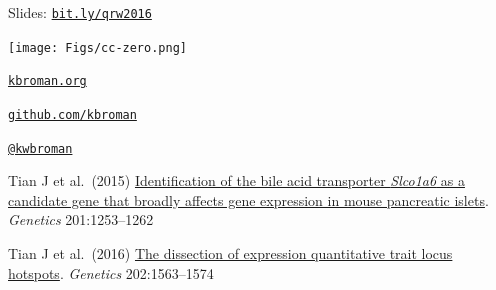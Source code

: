 \documentclass[12pt,t]{beamer}
\begin{document}
\begin{frame}[c]{}

\large

\vspace*{10mm}
Slides: \href{http://bit.ly/qrw2016}{\tt bit.ly/qrw2016}

\vspace*{-5mm}
\hspace{90mm} \texttt{[image: Figs/cc-zero.png]}

\vspace{2mm}

\href{http://kbroman.org}{\tt kbroman.org}

\vspace{2mm}

\href{https://github.com/kbroman}{\tt github.com/kbroman}

\vspace{2mm}

\href{https://twitter.com/kwbroman}{\tt @kwbroman}

\footnotesize
\vspace{12mm}

Tian J et al.\ (2015) \href{https://www.biostat.wisc.edu/~kbroman/publications/islet_chr6.pdf}{Identification of the bile acid transporter \emph{Slco1a6\/} as a
candidate gene that broadly affects gene expression in mouse
pancreatic islets}. \emph{Genetics\/} 201:1253--1262

\vspace{3mm}

Tian J et al.\ (2016) \href{https://www.biostat.wisc.edu/~kbroman/publications/transbandpaper_wsupp.pdf}{The dissection of expression quantitative trait
locus hotspots}. \emph{Genetics\/} 202:1563--1574



\end{frame}
\end{document}
